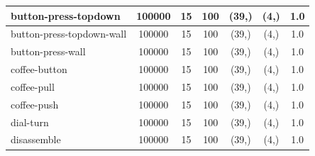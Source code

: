 \documentclass{article}
\theoremstyle{plain}
\theoremstyle{definition}
\theoremstyle{remark}
\begin{document}
\begin{table}[]
{\begin{tabular}{|l|c|c|c|c|c|c|}
button-press-topdown                & 100000                                        & 15                                                   & 100                                             & (39,)                                           & (4,) & 1.0                                            \\ \hline
button-press-topdown-wall           & 100000                                        & 15                                                   & 100                                             & (39,)                                           & (4,) & 1.0                                            \\ \hline
button-press-wall                   & 100000                                        & 15                                                   & 100                                             & (39,)                                           & (4,) & 1.0                                            \\ \hline
coffee-button                       & 100000                                        & 15                                                   & 100                                             & (39,)                                           & (4,) & 1.0                                            \\ \hline
coffee-pull                         & 100000                                        & 15                                                   & 100                                             & (39,)                                           & (4,) & 1.0                                            \\ \hline
coffee-push                         & 100000                                        & 15                                                   & 100                                             & (39,)                                           & (4,) & 1.0                                            \\ \hline
dial-turn                           & 100000                                        & 15                                                   & 100                                             & (39,)                                           & (4,) & 1.0                                            \\ \hline
disassemble                         & 100000                                        & 15                                                   & 100                                             & (39,)                                           & (4,) & 1.0                                            \\ \hline

\end{tabular}}
\end{table}
\end{document}
